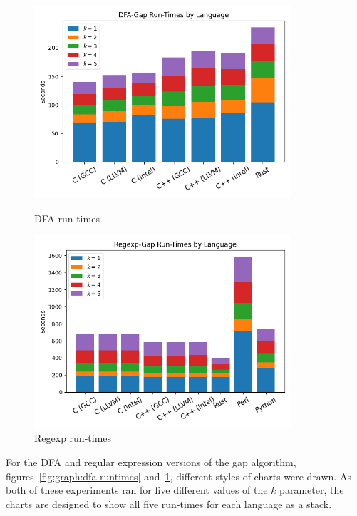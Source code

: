 \begin{figure}[ht]
    \centering
    \begin{minipage}[t]{0.45\textwidth}
        \centering
        \includegraphics[width=0.85\textwidth]{figures/algorithm_runtimes-dfa_gap.png}
        \caption{DFA run-times}
        \label{fig:graph:dfa-runtimes}
    \end{minipage}\hfill
    \begin{minipage}[t]{0.45\textwidth}
        \centering
        \includegraphics[width=0.85\textwidth]{figures/algorithm_runtimes-regexp.png}
        \caption{Regexp run-times}
        \label{fig:graph:regexp-runtimes}
    \end{minipage}
\end{figure}

For the DFA and regular expression versions of the gap algorithm, figures~\ref{fig:graph:dfa-runtimes} and~\ref{fig:graph:regexp-runtimes}, different styles of charts were drawn. As both of these experiments ran for five different values of the $k$ parameter, the charts are designed to show all five run-times for each language as a stack.

